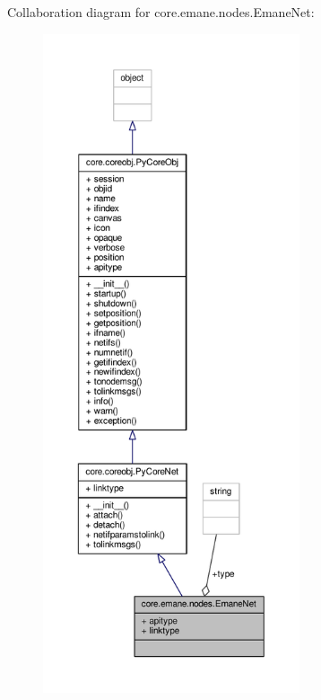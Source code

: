 Collaboration diagram for core.\+emane.\+nodes.\+Emane\+Net\+:
\nopagebreak
\begin{figure}[H]
\begin{center}
\leavevmode
\includegraphics[height=550pt]{classcore_1_1emane_1_1nodes_1_1_emane_net__coll__graph}
\end{center}
\end{figure}
